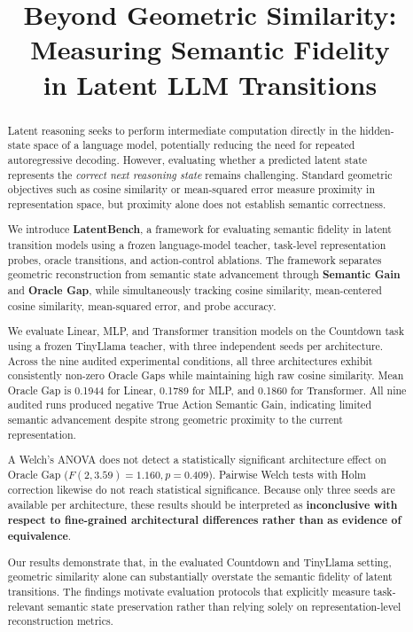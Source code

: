 \documentclass[conference]{IEEEtran}
\makeatletter
\def\@maketitle{%
  \newpage
  \null
  \begingroup
    \raggedleft
    \small\color{metadatagray}%
    Preprint\enspace$\cdot$\enspace September 2026\par
  \endgroup
  \vskip 1.2em%
  {\centering
   \fontsize{16}{19}\selectfont\bfseries\@title\par}
  \vskip 1.0em%
  {\centering
   \large\bfseries Vaibhav Singh\par
   \vskip 0.3em%
   \small\normalfont Independent Researcher\par
   \vskip 0.15em%
   \small\normalfont\color{metadatagray}%
   \href{mailto:singhvaibhavip@gmail.com}{singhvaibhavip@gmail.com}\par
  }%
  \vskip 1.0em%
  {\centering\rule{0.4\textwidth}{0.4pt}\par}%
  \vskip 0.8em%
}
\makeatother
\begin{document}
\title{Beyond Geometric Similarity: Measuring Semantic Fidelity\\in Latent LLM Transitions}

\author{}%

\maketitle

\begin{abstract}
Latent reasoning seeks to perform intermediate computation directly in the hidden-state space of a language model, potentially reducing the need for repeated autoregressive decoding. However, evaluating whether a predicted latent state represents the \textit{correct next reasoning state} remains challenging. Standard geometric objectives such as cosine similarity or mean-squared error measure proximity in representation space, but proximity alone does not establish semantic correctness.

We introduce \textbf{LatentBench}, a framework for evaluating semantic fidelity in latent transition models using a frozen language-model teacher, task-level representation probes, oracle transitions, and action-control ablations. The framework separates geometric reconstruction from semantic state advancement through \textbf{Semantic Gain} and \textbf{Oracle Gap}, while simultaneously tracking cosine similarity, mean-centered cosine similarity, mean-squared error, and probe accuracy.

We evaluate Linear, MLP, and Transformer transition models on the Countdown task using a frozen TinyLlama teacher, with three independent seeds per architecture. Across the nine audited experimental conditions, all three architectures exhibit consistently non-zero Oracle Gaps while maintaining high raw cosine similarity. Mean Oracle Gap is 0.1944 for Linear, 0.1789 for MLP, and 0.1860 for Transformer. All nine audited runs produced negative True Action Semantic Gain, indicating limited semantic advancement despite strong geometric proximity to the current representation.

A Welch's ANOVA does not detect a statistically significant architecture effect on Oracle Gap ($F(2,3.59)=1.160, p=0.409$). Pairwise Welch tests with Holm correction likewise do not reach statistical significance. Because only three seeds are available per architecture, these results should be interpreted as \textbf{inconclusive with respect to fine-grained architectural differences rather than as evidence of equivalence}.

Our results demonstrate that, in the evaluated Countdown and TinyLlama setting, geometric similarity alone can substantially overstate the semantic fidelity of latent transitions. The findings motivate evaluation protocols that explicitly measure task-relevant semantic state preservation rather than relying solely on representation-level reconstruction metrics.
\end{abstract}
\end{document}
